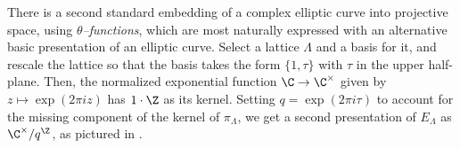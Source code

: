 There is a second standard embedding of a complex elliptic curve into projective space, using \textit{\(\theta\)--functions}, which are most naturally expressed with an alternative basic presentation of an elliptic curve.
Select a lattice \(\Lambda\) and a basis for it, and rescale the lattice so that the basis takes the form \(\{1, \tau\}\) with \(\tau\) in the upper half-plane.
Then, the normalized exponential function \(\C \to \C^{\times}\) given by \(z \mapsto \exp(2 \pi i z)\) has \(1 \cdot \Z\) as its kernel.
Setting \(q = \exp(2 \pi i \tau)\) to account for the missing component of the kernel of \(\pi_\Lambda\), we get a second presentation of \(E_\Lambda\) as \(\C^\times / q^{\Z}\), as pictured in .
\begin{figure}
\begin{center}
\end{center}
\end{figure}
